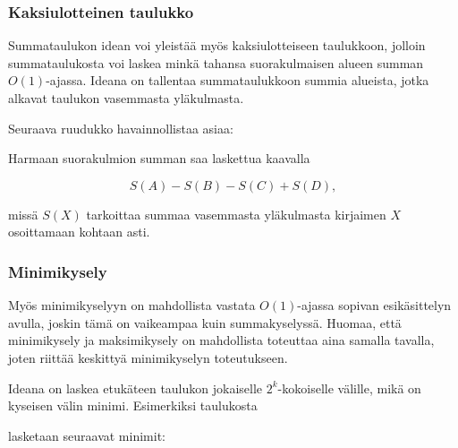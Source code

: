 \subsubsection{Kaksiulotteinen taulukko}

Summataulukon idean voi yleistää
myös kaksiulotteiseen taulukkoon,
jolloin summataulukosta voi laskea
minkä tahansa suorakulmaisen alueen
summan $O(1)$-ajassa.
Ideana on tallentaa summataulukkoon summia
alueista, jotka alkavat taulukon vasemmasta yläkulmasta.

Seuraava ruudukko havainnollistaa asiaa:
\\
\begin{center}
\end{center}

Harmaan suorakulmion summan saa laskettua kaavalla

\[S(A) - S(B) - S(C) + S(D),\]

missä $S(X)$ tarkoittaa summaa vasemmasta
yläkulmasta kirjaimen $X$ osoittamaan kohtaan asti.

\subsubsection{Minimikysely}

Myös minimikyselyyn on mahdollista
vastata $O(1)$-ajassa sopivan esikäsittelyn avulla,
joskin tämä on vaikeampaa kuin summakyselyssä.
Huomaa, että minimikysely ja maksimikysely on
mahdollista toteuttaa aina samalla tavalla,
joten riittää keskittyä minimikyselyn toteutukseen. 

Ideana on laskea etukäteen taulukon jokaiselle
$2^k$-kokoiselle välille, mikä on kyseisen välin minimi.
Esimerkiksi taulukosta

\begin{center}
\end{center}
lasketaan seuraavat minimit:

